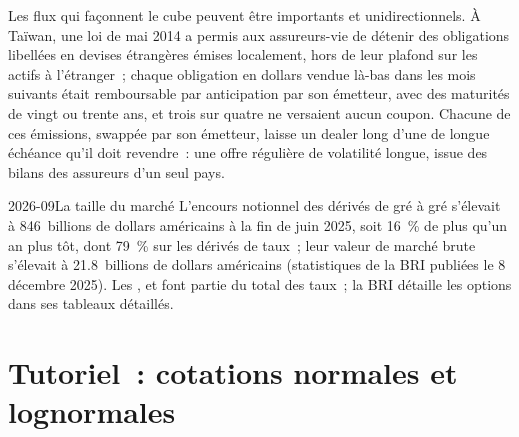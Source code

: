 Les flux qui façonnent le cube peuvent être importants et unidirectionnels. À Taïwan, une loi de
mai 2014 a permis aux assureurs-vie de détenir des obligations libellées en devises étrangères émises localement, hors de
leur plafond sur les actifs à l'étranger~; chaque obligation en dollars vendue là-bas dans les mois suivants
était remboursable par anticipation par son émetteur, avec des maturités de vingt ou trente ans,
et trois sur quatre ne versaient aucun coupon. Chacune de ces émissions, swappée par son émetteur, laisse
un dealer long d'une  de longue échéance qu'il doit revendre~: une offre régulière
de volatilité longue, issue des bilans
des assureurs d'un seul pays.

\begin{dated}{2026-09}{La taille du marché}\label{dat:m2:the-rates-options-market:size}
L'encours notionnel des dérivés de gré à gré s'élevait à 846~billions de dollars américains à la fin
de juin 2025, soit 16~\% de plus qu'un an plus tôt, dont 79~\% sur les dérivés de taux~; leur valeur de
marché brute s'élevait à 21.8~billions de dollars américains (statistiques de la BRI
publiées le 8 décembre 2025). Les ,  et  font partie du total des taux~;
la BRI détaille les options dans ses tableaux détaillés.
\end{dated}

\section{Tutoriel~: cotations normales et lognormales}\label{tut:m2:the-rates-options-market:quotes}


